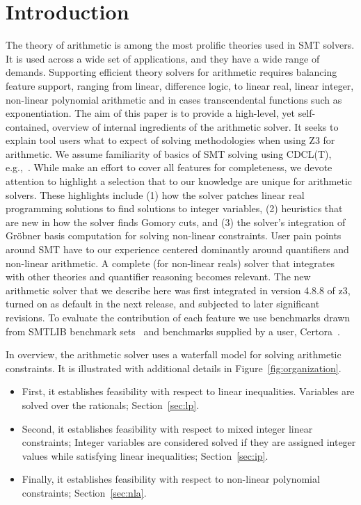 \section{Introduction}

The theory of arithmetic
is among the most prolific theories used in SMT solvers. It is used across a wide set of
applications, and they have a wide range of demands.
Supporting efficient theory solvers for arithmetic requires balancing feature support,
ranging from linear, difference logic, to linear real, linear integer, non-linear polynomial arithmetic
and in cases transcendental functions such as exponentiation.
The aim of this paper is to provide a high-level, yet self-contained, overview of internal ingredients of the arithmetic solver.
It seeks to explain tool users what to expect of solving methodologies when using Z3 for arithmetic.
We assume familiarity of basics of SMT solving using CDCL(T), e.g.,~\cite{z3internals}.
While make an effort to cover all features for completeness,
we devote attention to highlight a selection that to our knowledge are unique for arithmetic solvers.
These highlights include
(1) how the solver patches linear real programming solutions to find solutions to integer variables,
(2) heuristics that are new in how the solver finds Gomory cuts, and
(3) the solver's integration of Gr{\"o}bner basis computation for solving non-linear constraints.
User pain points around SMT have to our experience centered dominantly
around quantifiers and non-linear arithmetic. A complete (for non-linear reals) solver that integrates
with other theories and quantifier reasoning becomes relevant. The new arithmetic solver that we describe here
was first integrated in version 4.8.8 of z3, turned on as default in the next release,
and subjected to later significant revisions.
To evaluate the contribution of each feature we use benchmarks drawn
from SMTLIB benchmark sets~\cite{SMTLIB2} and benchmarks supplied by a user, 
Certora~\cite{bench-submission}.

In overview, the arithmetic solver uses a waterfall model for solving arithmetic constraints.
It is illustrated with additional details in Figure~\ref{fig:organization}.


\begin{itemize}
  \item First, it establishes feasibility with respect to linear inequalities. Variables are solved over the rationals; Section~\ref{sec:lp}.
  \item Second, it establishes feasibility with respect to mixed integer linear constraints; 
        Integer variables are considered solved if they are assigned integer values while satisfying linear inequalities; Section~\ref{sec:ip}. 
  \item Finally, it establishes feasibility with respect to non-linear polynomial constraints; Section~\ref{sec:nla}.
\end{itemize}



